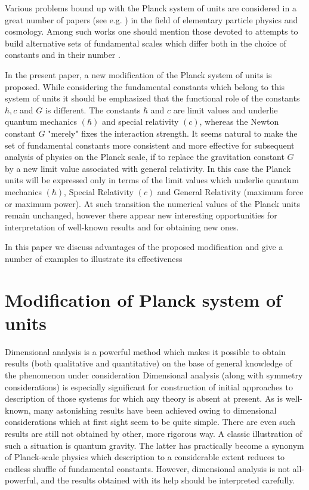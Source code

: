 \documentclass [12pt]{article}
\begin{document}
Various problems bound up with the Planck system of units are considered in a great number of papers  (see e.g. \cite{s2,s3,s4,s5,s6}) in the field of elementary particle physics and cosmology. Among such works one should mention  those devoted to attempts to build alternative sets of fundamental scales which differ  both in the choice of constants and in their number \cite{s7,s8,s9,s10}.

In the present paper, a new modification of the Planck system of units is proposed. While considering the fundamental constants which belong to this system of units it should be emphasized that the functional role of the constants  $\hbar, c$ and $G$ is different. The constants $\hbar$ and $c$  are limit values and underlie quantum mechanics $(\hbar)$ and special relativity $(c)$, whereas the Newton constant $G$ "merely" fixes the interaction strength. It seems natural to make the set of fundamental constants more consistent and more effective for subsequent analysis of physics on the Planck scale, if to replace the gravitation constant  $G$ by a new limit value associated with general relativity. In this case the Planck units will be expressed only in terms of the limit values  which underlie quantum mechanics $(\hbar)$, Special Relativity $(c)$ and General Relativity (maximum force or maximum power). At such transition   the numerical values of the Planck units remain unchanged, however there appear new interesting  opportunities  for interpretation of well-known results and for obtaining  new ones.

In this paper we discuss advantages of the proposed modification and give a number of examples to illustrate its effectiveness

\section{Modification of Planck  system of units}

Dimensional analysis is a powerful method which makes it possible to obtain results  (both qualitative and quantitative) on the base of general knowledge of the  phenomenon under consideration  Dimensional analysis (along with symmetry considerations) is especially significant  for construction of initial approaches to description of those systems for which any theory is absent at present. As is well-known, many astonishing results have been achieved owing to  dimensional considerations which at first sight seem to be quite simple. There are even such results are still not obtained by other, more rigorous way. A classic illustration of such a situation is quantum gravity. The latter has practically  become a synonym of Planck-scale physics which description to a considerable extent reduces to endless shuffle of fundamental constants. However, dimensional analysis is not all-powerful, and the results obtained with its help should be interpreted carefully.
\end{document}
